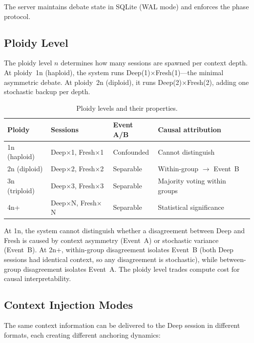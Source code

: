 \documentclass[11pt]{article}
\begin{document}
The server maintains debate state in SQLite (WAL mode) and enforces the phase protocol.

\subsection{Ploidy Level}
\label{sec:ploidy-level}

The ploidy level $n$ determines how many sessions are spawned per context depth. At ploidy~1n (haploid), the system runs Deep(1)$\times$Fresh(1)---the minimal asymmetric debate. At ploidy~2n (diploid), it runs Deep(2)$\times$Fresh(2), adding one stochastic backup per depth.

\begin{table}[t]
\centering
\caption{Ploidy levels and their properties.}
\label{tab:ploidy-levels}
\small
\begin{tabular}{@{}llll@{}}
\toprule
\textbf{Ploidy} & \textbf{Sessions} & \textbf{Event A/B} & \textbf{Causal attribution} \\
\midrule
1n (haploid) & Deep$\times$1, Fresh$\times$1 & Confounded & Cannot distinguish \\
2n (diploid) & Deep$\times$2, Fresh$\times$2 & Separable & Within-group $\to$ Event~B \\
3n (triploid) & Deep$\times$3, Fresh$\times$3 & Separable & Majority voting within groups \\
4n+ & Deep$\times$N, Fresh$\times$N & Separable & Statistical significance \\
\bottomrule
\end{tabular}
\end{table}

At 1n, the system cannot distinguish whether a disagreement between Deep and Fresh is caused by context asymmetry (Event~A) or stochastic variance (Event~B). At 2n+, within-group disagreement isolates Event~B (both Deep sessions had identical context, so any disagreement is stochastic), while between-group disagreement isolates Event~A. The ploidy level trades compute cost for causal interpretability.

\subsection{Context Injection Modes}
\label{sec:injection-modes}

The same context information can be delivered to the Deep session in different formats, each creating different anchoring dynamics:
\end{document}
